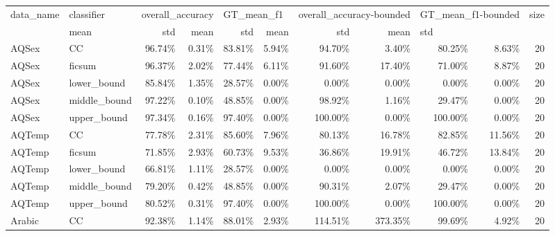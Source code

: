 \begin{tabular}{llrrrrrrrrr}
\toprule
   data\_name &    classifier & \multicolumn{2}{l}{overall\_accuracy} & \multicolumn{2}{l}{GT\_mean\_f1} & \multicolumn{2}{l}{overall\_accuracy-bounded} & \multicolumn{2}{l}{GT\_mean\_f1-bounded} & size \\
             &             mean &   std &       mean &    std &                     mean &     std &               mean & \multicolumn{2}{l}{std} \\
\midrule
       AQSex &            CC &           96.74\% & 0.31\% &     83.81\% &  5.94\% &                   94.70\% &   3.40\% &             80.25\% &  8.63\% &   20 \\
       AQSex &        ficsum &           96.37\% & 2.02\% &     77.44\% &  6.11\% &                   91.60\% &  17.40\% &             71.00\% &  8.87\% &   20 \\
       AQSex &   lower\_bound &           85.84\% & 1.35\% &     28.57\% &  0.00\% &                    0.00\% &   0.00\% &              0.00\% &  0.00\% &   20 \\
       AQSex &  middle\_bound &           97.22\% & 0.10\% &     48.85\% &  0.00\% &                   98.92\% &   1.16\% &             29.47\% &  0.00\% &   20 \\
       AQSex &   upper\_bound &           97.34\% & 0.16\% &     97.40\% &  0.00\% &                  100.00\% &   0.00\% &            100.00\% &  0.00\% &   20 \\
      AQTemp &            CC &           77.78\% & 2.31\% &     85.60\% &  7.96\% &                   80.13\% &  16.78\% &             82.85\% & 11.56\% &   20 \\
      AQTemp &        ficsum &           71.85\% & 2.93\% &     60.73\% &  9.53\% &                   36.86\% &  19.91\% &             46.72\% & 13.84\% &   20 \\
      AQTemp &   lower\_bound &           66.81\% & 1.11\% &     28.57\% &  0.00\% &                    0.00\% &   0.00\% &              0.00\% &  0.00\% &   20 \\
      AQTemp &  middle\_bound &           79.20\% & 0.42\% &     48.85\% &  0.00\% &                   90.31\% &   2.07\% &             29.47\% &  0.00\% &   20 \\
      AQTemp &   upper\_bound &           80.52\% & 0.31\% &     97.40\% &  0.00\% &                  100.00\% &   0.00\% &            100.00\% &  0.00\% &   20 \\
      Arabic &            CC &           92.38\% & 1.14\% &     88.01\% &  2.93\% &                  114.51\% & 373.35\% &             99.69\% &  4.92\% &   20 \\

\end{tabular}
